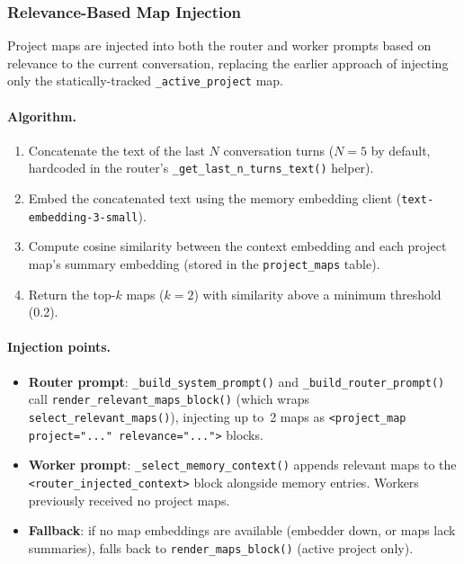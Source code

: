 \documentclass[11pt,a4paper]{article}
\newcommand{\code}[1]{\texttt{#1}}
\begin{document}
\subsubsection{Relevance-Based Map Injection}
\label{sec:map-injection}

Project maps are injected into both the router and worker prompts based
on relevance to the current conversation, replacing the earlier approach
of injecting only the statically-tracked \code{\_active\_project} map.

\paragraph{Algorithm.}
\begin{enumerate}[nosep]
  \item Concatenate the text of the last $N$ conversation turns
        ($N{=}5$ by default, hardcoded in the router's
        \code{\_get\_last\_n\_turns\_text()} helper).
  \item Embed the concatenated text using the memory embedding client
        (\code{text-embedding-3-small}).
  \item Compute cosine similarity between the context embedding and each
        project map's summary embedding (stored in the
        \code{project\_maps} table).
  \item Return the top-$k$ maps ($k{=}2$) with similarity above a
        minimum threshold (0.2).
\end{enumerate}

\paragraph{Injection points.}
\begin{itemize}[nosep]
  \item \textbf{Router prompt}: \code{\_build\_system\_prompt()} and
        \code{\_build\_router\_prompt()} call
        \code{render\_relevant\_maps\_block()} (which wraps
        \code{select\_relevant\_maps()}), injecting up to~2 maps as
        \code{<project\_map project="..." relevance="...">} blocks.
  \item \textbf{Worker prompt}: \code{\_select\_memory\_context()}
        appends relevant maps to the
        \code{<router\_injected\_context>} block alongside memory
        entries. Workers previously received no project maps.
  \item \textbf{Fallback}: if no map embeddings are available (embedder
        down, or maps lack summaries), falls back to
        \code{render\_maps\_block()} (active project only).
\end{itemize}
\end{document}
